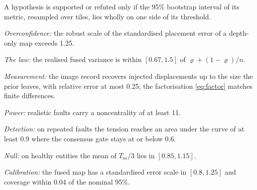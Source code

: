  A hypothesis is supported or refuted only if the 95\% bootstrap interval of its
metric, resampled over tiles, lies wholly on one side of its threshold.
\begin{description}\setlength{\itemsep}{1pt}
  \item[H1] \emph{Overconfidence:} the robust scale of the standardised placement error of a depth-only
        map exceeds 1.25.
  \item[H2] \emph{The law:} the realised fused variance is within $[0.67,1.5]$ of
        $\varrho+(1-\varrho)/n$.
  \item[H3] \emph{Measurement:} the image record recovers injected displacements up to the size the prior
        leaves, with relative error at most 0.25; the factorisation \eqref{eq:factor} matches finite
        differences.
  \item[H4] \emph{Power:} realistic faults carry a noncentrality of at least 11.
  \item[H5] \emph{Detection:} on repeated faults the tension reaches an area under the curve of at
        least 0.9 where the consensus gate stays at or below 0.6.
  \item[H6] \emph{Null:} on healthy entities the mean of $T_m/3$ lies in $[0.85,1.15]$.
  \item[H7] \emph{Calibration:} the fused map has a standardised error scale in $[0.8,1.25]$ and coverage
        within 0.04 of the nominal 95\%.
\end{description}

